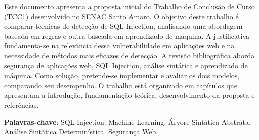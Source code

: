 \documentclass[
    12pt,                %
    openright,           %
    oneside,             %
    a4paper,             %
    english,             %
    brazil               %
]{abntex2}
\begin{document}

\frenchspacing

\pretextual

\imprimircapa

\imprimirfolhaderosto

\begin{resumo}
Este documento apresenta a proposta inicial do Trabalho de Conclusão de Curso (TCC1) desenvolvido no SENAC Santo Amaro. O objetivo deste trabalho é comparar técnicas de detecção de SQL Injection, analisando uma abordagem baseada em regras e outra baseada em aprendizado de máquina. A justificativa fundamenta-se na relevância dessa vulnerabilidade em aplicações web e na necessidade de métodos mais eficazes de detecção. A revisão bibliográfica aborda segurança de aplicações web, SQL Injection, análise sintática e aprendizado de máquina. Como solução, pretende-se implementar e avaliar os dois modelos, comparando seu desempenho. O trabalho está organizado em capítulos que apresentam a introdução, fundamentação teórica, desenvolvimento da proposta e referências.

\vspace{\onelineskip}

\noindent
\textbf{Palavras-chave}: SQL Injection. Machine Learning. Árvore Sintática Abstrata. Análise Sintática Determinística. Segurança Web.
\end{resumo}


\end{document}
